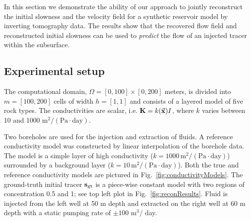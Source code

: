 \documentclass[english]{siamltex}
\newcommand {\bsgt}   { {\bf s_\text{gt}} }
\newcommand {\bfK}  { {\bf K} }
\newcommand {\vx}    {\vec {\bf x}}
\begin{document}
In this section we demonstrate the ability of our approach to jointly reconstruct the initial slowness and the velocity field for a synthetic reservoir model by inverting tomography data. The results show that the recovered flow field and reconstructed initial slowness can be used to \emph{predict} the flow of an injected tracer within the subsurface.

\subsection{Experimental setup} %
\label{sub:experimental_setup}
The computational domain, $\Omega=[0, 100] \times [0, 200]$ meters, is divided into $m=[100, 200]$ cells of width $h=[1,1]$ and consists of a layered model of five rock types. The conductivities are scalar, i.e. $\bfK= k(\vx) I$, where $k$ varies between 10 and 1000 $\mathrm{m}^2/(\mathrm{Pa}\cdot \mathrm{day} )$. 

Two boreholes are used for the injection and extraction of fluids.
A reference conductivity model was constructed by linear interpolation of the borehole data. 
The model is a simple layer of high conductivity ($k=1000\, \mathrm{m}^2/(\mathrm{Pa}\cdot \mathrm{day})$) surrounded by a background layer ($k=10 \, \mathrm{m}^2/(\mathrm{Pa}\cdot \mathrm{day}) $). Both the true and reference conductivity models are pictured in Fig.~\ref{fig:conductivityModels}.
The ground-truth initial tracer  $\bsgt$ is a piece-wise constant model with two regions of concentration 0.5 and 1; see top left plot in Fig.~\ref{fig:reconResults}. 
Fluid is injected from the left well at 50 m depth and extracted on the right well at 60 m depth with a static pumping rate of $\pm100 $ m$^3/$ day. 
\end{document}
